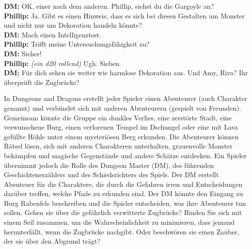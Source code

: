 \begin{quotebox}
\textbf{DM:} OK, einer nach dem anderen. Phillip, siehst du die Gargoyle an?\\
\textbf{Phillip:}
Ja. Gibt es einen Hinweis, dass es sich bei diesen Gestalten um Monster und nicht nur um Dekoration handeln könnte?\\
\textbf{DM:}
Mach einen Intelligenztest.\\
\textbf{Phillip:}
Trifft meine Untersuchungsfähigkeit zu?\\
\textbf{DM:}
Sicher!\\
\textbf{Phillip:} \textit{(ein d20 rollend)}
Ugh. Sieben.\\
\textbf{DM:}
Für dich sehen sie weiter wie harmlose Dekoration aus. Und Amy, Riva? Ihr überprüft die Zugbrücke?
\end{quotebox}

In Dungeons and Dragons erstellt jeder Spieler einen Abenteurer (auch Charakter genannt) und verbündet sich mit anderen Abenteurern (gespielt von Freunden). Gemeinsam könnte die Gruppe ein dunkles Verlies, eine zerstörte Stadt, eine verwunschene Burg, einen verlorenen Tempel im Dschungel oder eine mit Lava gefüllte Höhle unter einem mysteriösen Berg erkunden. Die Abenteurer können Rätsel lösen, sich mit anderen Charakteren unterhalten, grauenvolle Monster bekämpfen und magische Gegenstände und andere Schätze entdecken. Ein Spieler übernimmt jedoch die Rolle des Dungeon Master (DM), des führenden Geschichtenerzählers und des Schiedsrichters des Spiels. Der DM erstellt Abenteuer für die Charaktere, die durch die Gefahren irren und Entscheidungen darüber treffen, welche Pfade zu erkunden sind. Der DM könnte den Eingang zu Burg Rabenfels beschreiben und die Spieler entscheiden, was ihre Abenteurer tun sollen. Gehen sie über die gefährlich verwitterte Zugbrücke? Binden Sie sich mit einem Seil zusammen, um die Wahrscheinlichkeit zu minimieren, dass jemand herunterfällt, wenn die Zugbrücke nachgibt. Oder beschwören sie einen Zauber, der sie über den Abgrund trägt?

